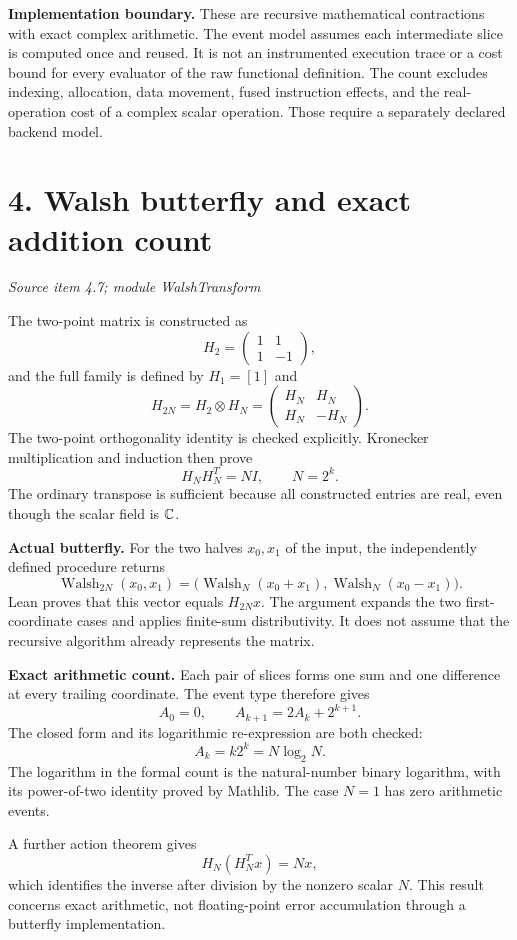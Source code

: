 \documentclass[11pt]{article}
\newcommand{\pageheading}[2]{\section*{\color{ink}#1}\textit{#2}\par}
\begin{document}
\textbf{Implementation boundary.} These are recursive mathematical contractions with exact complex arithmetic. The event model assumes each intermediate slice is computed once and reused. It is not an instrumented execution trace or a cost bound for every evaluator of the raw functional definition. The count excludes indexing, allocation, data movement, fused instruction effects, and the real-operation cost of a complex scalar operation. Those require a separately declared backend model.

\newpage
\pageheading{4. Walsh butterfly and exact addition count}{Source item 4.7; module WalshTransform}
The two-point matrix is constructed as
\[
H_2=\begin{pmatrix}1&1\\1&-1\end{pmatrix},
\]
and the full family is defined by $H_1=[1]$ and
\[
H_{2N}=H_2\otimes H_N
=\begin{pmatrix}H_N&H_N\\H_N&-H_N\end{pmatrix}.
\]
The two-point orthogonality identity is checked explicitly. Kronecker multiplication and induction then prove
\[
\boxed{H_NH_N^T=NI,\qquad N=2^k.}
\]
The ordinary transpose is sufficient because all constructed entries are real, even though the scalar field is $\mathbb C$.

\textbf{Actual butterfly.} For the two halves $x_0,x_1$ of the input, the independently defined procedure returns
\[
\operatorname{Walsh}_{2N}(x_0,x_1)
=\bigl(\operatorname{Walsh}_N(x_0+x_1),
       \operatorname{Walsh}_N(x_0-x_1)\bigr).
\]
Lean proves that this vector equals $H_{2N}x$. The argument expands the two first-coordinate cases and applies finite-sum distributivity. It does not assume that the recursive algorithm already represents the matrix.

\textbf{Exact arithmetic count.} Each pair of slices forms one sum and one difference at every trailing coordinate. The event type therefore gives
\[
A_0=0,\qquad A_{k+1}=2A_k+2^{k+1}.
\]
The closed form and its logarithmic re-expression are both checked:
\[
\boxed{A_k=k2^k=N\log_2N.}
\]
The logarithm in the formal count is the natural-number binary logarithm, with its power-of-two identity proved by Mathlib. The case $N=1$ has zero arithmetic events.

A further action theorem gives
\[
H_N(H_N^Tx)=Nx,
\]
which identifies the inverse after division by the nonzero scalar $N$. This result concerns exact arithmetic, not floating-point error accumulation through a butterfly implementation.
\end{document}

